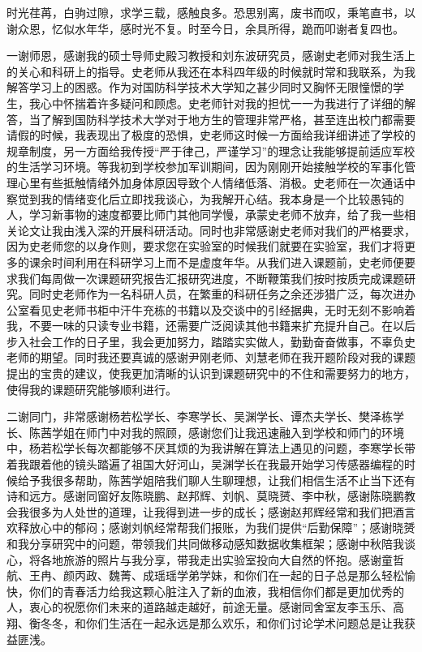 

\begin{ack}
\par 时光荏苒，白驹过隙，求学三载，感触良多。恐思别离，废书而叹，秉笔直书，以谢众恩，忆似水年华，感时光不复。时至今日，余具所得，跪而叩谢者复四也。
\par 一谢师恩，感谢我的硕士导师史殿习教授和刘东波研究员，感谢史老师对我生活上的关心和科研上的指导。史老师从我还在本科四年级的时候就时常和我联系，为我解答学习上的困惑。作为对国防科学技术大学知之甚少同时又胸怀无限憧憬的学生，我心中怀揣着许多疑问和顾虑。史老师针对我的担忧一一为我进行了详细的解答，当了解到国防科学技术大学对于地方生的管理非常严格，甚至连出校门都需要请假的时候，我表现出了极度的恐惧，史老师这时候一方面给我详细讲述了学校的规章制度，另一方面给我传授“严于律己，严谨学习”的理念让我能够提前适应军校的生活学习环境。等我初到学校参加军训期间，因为刚刚开始接触学校的军事化管理心里有些抵触情绪外加身体原因导致个人情绪低落、消极。史老师在一次通话中察觉到我的情绪变化后立即找我谈心，为我解开心结。我本身是一个比较愚钝的人，学习新事物的速度都要比师门其他同学慢，承蒙史老师不放弃，给了我一些相关论文让我由浅入深的开展科研活动。同时也非常感谢史老师对我们的严格要求，因为史老师您的以身作则，要求您在实验室的时候我们就要在实验室，我们才将更多的课余时间利用在科研学习上而不是虚度年华。从我们进入课题前，史老师便要求我们每周做一次课题研究报告汇报研究进度，不断鞭策我们按时按质完成课题研究。同时史老师作为一名科研人员，在繁重的科研任务之余还涉猎广泛，每次进办公室看见史老师书柜中汗牛充栋的书籍以及交谈中的引经据典，无时无刻不影响着我，不要一味的只读专业书籍，还需要广泛阅读其他书籍来扩充提升自己。在以后步入社会工作的日子里，我会更加努力，踏踏实实做人，勤勤奋奋做事，不辜负史老师的期望。同时我还要真诚的感谢尹刚老师、刘慧老师在我开题阶段对我的课题提出的宝贵的建议，使我更加清晰的认识到课题研究中的不住和需要努力的地方，使得我的课题研究能够顺利进行。

\par 二谢同门，非常感谢杨若松学长、李寒学长、吴渊学长、谭杰夫学长、樊泽栋学长、陈茜学姐在师门中对我的照顾，感谢您们让我迅速融入到学校和师门的环境中，杨若松学长每次都能够不厌其烦的为我讲解在算法上遇见的问题，李寒学长带着我跟着他的镜头踏遍了祖国大好河山，吴渊学长在我最开始学习传感器编程的时候给予我很多帮助，陈茜学姐陪我们聊人生聊理想，让我们相信生活不止当下还有诗和远方。感谢同窗好友陈晓鹏、赵邦辉、刘帆、莫晓赟、李中秋，感谢陈晓鹏教会我很多为人处世的道理，让我得到进一步的成长；感谢赵邦辉经常和我们把酒言欢释放心中的郁闷；感谢刘帆经常帮我们报账，为我们提供“后勤保障”；感谢晓赟和我分享研究中的问题，带领我们共同做移动感知数据收集框架；感谢中秋陪我谈心，将各地旅游的照片与我分享，带我走出实验室投向大自然的怀抱。感谢童哲航、王冉、颜丙政、魏菁、成瑶瑶学弟学妹，和你们在一起的日子总是那么轻松愉快，你们的青春活力给我这颗心脏注入了新的血液，我相信你们都是更加优秀的人，衷心的祝愿你们未来的道路越走越好，前途无量。感谢同舍室友李玉乐、高翔、衡冬冬，和你们生活在一起永远是那么欢乐，和你们讨论学术问题总是让我获益匪浅。


\end{ack}
